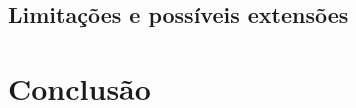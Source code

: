 \documentclass[12pt,a4paper]{article}
\begin{document}
\subsection{Limitações e possíveis extensões}
\label{sec:limitacoes}

\section{Conclusão}
\label{sec:conclusao}



\end{document}
